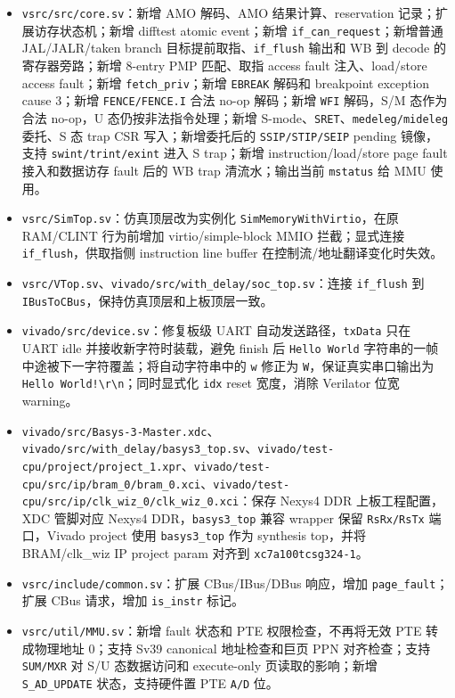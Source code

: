 \documentclass[UTF8,a4paper,11pt]{ctexart}
\begin{document}
\begin{itemize}
  \item \texttt{vsrc/src/core.sv}：新增 AMO 解码、AMO 结果计算、reservation 记录；扩展访存状态机；新增 difftest atomic event；新增 \texttt{if\_can\_request}；新增普通 JAL/JALR/taken branch 目标提前取指、\texttt{if\_flush} 输出和 WB 到 decode 的寄存器旁路；新增 8-entry PMP 匹配、取指 access fault 注入、load/store access fault；新增 \texttt{fetch\_priv}；新增 \texttt{EBREAK} 解码和 breakpoint exception cause 3；新增 \texttt{FENCE/FENCE.I} 合法 no-op 解码；新增 \texttt{WFI} 解码，S/M 态作为合法 no-op，U 态仍按非法指令处理；新增 S-mode、\texttt{SRET}、\texttt{medeleg/mideleg} 委托、S 态 trap CSR 写入；新增委托后的 \texttt{SSIP/STIP/SEIP} pending 镜像，支持 \texttt{swint/trint/exint} 进入 S trap；新增 instruction/load/store page fault 接入和数据访存 fault 后的 WB trap 清流水；输出当前 \texttt{mstatus} 给 MMU 使用。
  \item \texttt{vsrc/SimTop.sv}：仿真顶层改为实例化 \texttt{SimMemoryWithVirtio}，在原 RAM/CLINT 行为前增加 virtio/simple-block MMIO 拦截；显式连接 \texttt{if\_flush}，供取指侧 instruction line buffer 在控制流/地址翻译变化时失效。
  \item \texttt{vsrc/VTop.sv}、\texttt{vivado/src/with\_delay/soc\_top.sv}：连接 \texttt{if\_flush} 到 \texttt{IBusToCBus}，保持仿真顶层和上板顶层一致。
  \item \texttt{vivado/src/device.sv}：修复板级 UART 自动发送路径，\texttt{txData} 只在 UART idle 并接收新字符时装载，避免 finish 后 \texttt{Hello World} 字符串的一帧中途被下一字符覆盖；将自动字符串中的 \texttt{w} 修正为 \texttt{W}，保证真实串口输出为 \texttt{Hello World!\textbackslash r\textbackslash n}；同时显式化 \texttt{idx} reset 宽度，消除 Verilator 位宽 warning。
  \item \texttt{vivado/src/Basys-3-Master.xdc}、\texttt{vivado/src/with\_delay/basys3\_top.sv}、\texttt{vivado/test-cpu/project/project\_1.xpr}、\texttt{vivado/test-cpu/src/ip/bram\_0/bram\_0.xci}、\texttt{vivado/test-cpu/src/ip/clk\_wiz\_0/clk\_wiz\_0.xci}：保存 Nexys4 DDR 上板工程配置，XDC 管脚对应 Nexys4 DDR，\texttt{basys3\_top} 兼容 wrapper 保留 \texttt{RsRx/RsTx} 端口，Vivado project 使用 \texttt{basys3\_top} 作为 synthesis top，并将 BRAM/clk\_wiz IP project param 对齐到 \texttt{xc7a100tcsg324-1}。
  \item \texttt{vsrc/include/common.sv}：扩展 CBus/IBus/DBus 响应，增加 \texttt{page\_fault}；扩展 CBus 请求，增加 \texttt{is\_instr} 标记。
  \item \texttt{vsrc/util/MMU.sv}：新增 fault 状态和 PTE 权限检查，不再将无效 PTE 转成物理地址 0；支持 Sv39 canonical 地址检查和巨页 PPN 对齐检查；支持 \texttt{SUM/MXR} 对 S/U 态数据访问和 execute-only 页读取的影响；新增 \texttt{S\_AD\_UPDATE} 状态，支持硬件置 PTE \texttt{A/D} 位。

\end{itemize}
\end{document}
